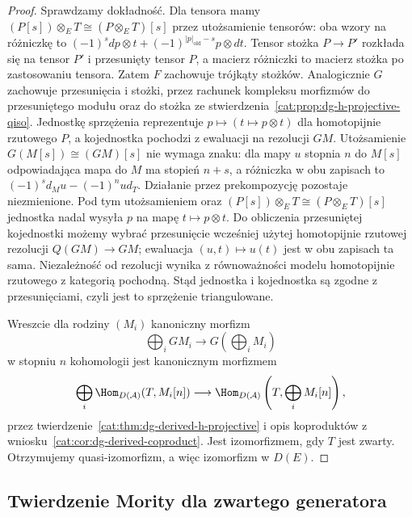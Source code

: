 \begin{proof}
Sprawdzamy dokładność. Dla tensora mamy $(P[s])\otimes_E T\cong(P\otimes_E T)[s]$ przez utożsamienie tensorów: oba wzory na różniczkę to $(-1)^s dp\otimes t+(-1)^{|p|_{\mathrm{old}}-s}p\otimes dt$. Tensor stożka $P\to P'$ rozkłada się na tensor $P'$ i przesunięty tensor $P$, a macierz różniczki to macierz stożka po zastosowaniu tensora. Zatem $F$ zachowuje trójkąty stożków. Analogicznie $G$ zachowuje przesunięcia i stożki, przez rachunek kompleksu morfizmów do przesuniętego modułu oraz do stożka ze stwierdzenia~\ref{cat:prop:dg-h-projective-qiso}. Jednostkę sprzężenia reprezentuje $p\mapsto(t\mapsto p\otimes t)$ dla homotopijnie rzutowego $P$, a kojednostka pochodzi z ewaluacji na rezolucji $G M$. Utożsamienie $G(M[s])\cong (GM)[s]$ nie wymaga znaku: dla mapy $u$ stopnia $n$ do $M[s]$ odpowiadająca mapa do $M$ ma stopień $n+s$, a różniczka w obu zapisach to $(-1)^s d_Mu-(-1)^nu d_T$. Działanie przez prekompozycję pozostaje niezmienione. Pod tym utożsamieniem oraz $(P[s])\otimes_E T\cong(P\otimes_E T)[s]$ jednostka nadal wysyła $p$ na mapę $t\mapsto p\otimes t$. Do obliczenia przesuniętej kojednostki możemy wybrać przesunięcie wcześniej użytej homotopijnie rzutowej rezolucji $Q(GM)\to GM$; ewaluacja $(u,t)\mapsto u(t)$ jest w obu zapisach ta sama. Niezależność od rezolucji wynika z równoważności modelu homotopijnie rzutowego z kategorią pochodną. Stąd jednostka i kojednostka są zgodne z przesunięciami, czyli jest to sprzężenie triangulowane.

Wreszcie dla rodziny $(M_i)$ kanoniczny morfizm
\[
 \bigoplus_i G M_i\longrightarrow G\left(\bigoplus_i M_i\right)
\]
w stopniu $n$ kohomologii jest kanonicznym morfizmem
\[
 \bigoplus_i\Hom_{D(\mathcal A)}(T,M_i[n])
 \longrightarrow\Hom_{D(\mathcal A)}\left(T,\bigoplus_i M_i[n]\right),
\]
przez twierdzenie~\ref{cat:thm:dg-derived-h-projective} i opis koproduktów z wniosku~\ref{cat:cor:dg-derived-coproduct}. Jest izomorfizmem, gdy $T$ jest zwarty. Otrzymujemy quasi-izomorfizm, a więc izomorfizm w $D(E)$.
\end{proof}

\subsection{Twierdzenie Mority dla zwartego generatora}

